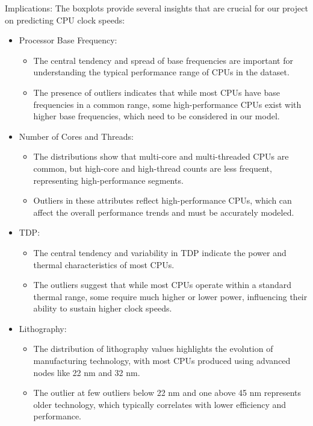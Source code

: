 Implications:
The boxplots provide several insights that are crucial for our project on predicting CPU clock speeds:

\begin{itemize}
    \item Processor Base Frequency:
    \begin{itemize}
        \item The central tendency and spread of base frequencies are important for understanding the typical performance range of CPUs in the dataset.
        \item The presence of outliers indicates that while most CPUs have base frequencies in a common range, some high-performance CPUs exist with higher base frequencies, which need to be considered in our model.
    \end{itemize}
    
    \item Number of Cores and Threads:
    \begin{itemize}
        \item The distributions show that multi-core and multi-threaded CPUs are common, but high-core and high-thread counts are less frequent, representing high-performance segments.
        \item Outliers in these attributes reflect high-performance CPUs, which can affect the overall performance trends and must be accurately modeled.
    \end{itemize}
    
    \item TDP:
    \begin{itemize}
        \item The central tendency and variability in TDP indicate the power and thermal characteristics of most CPUs.
        \item The outliers suggest that while most CPUs operate within a standard thermal range, some require much higher or lower power, influencing their ability to sustain higher clock speeds.
    \end{itemize}
    
    \item Lithography:
    \begin{itemize}
        \item The distribution of lithography values highlights the evolution of manufacturing technology, with most CPUs produced using advanced nodes like 22 nm and 32 nm.
        \item The outlier at few outliers below 22 nm and one above 45 nm represents older technology, which typically correlates with lower efficiency and performance.
    \end{itemize}
\end{itemize}
